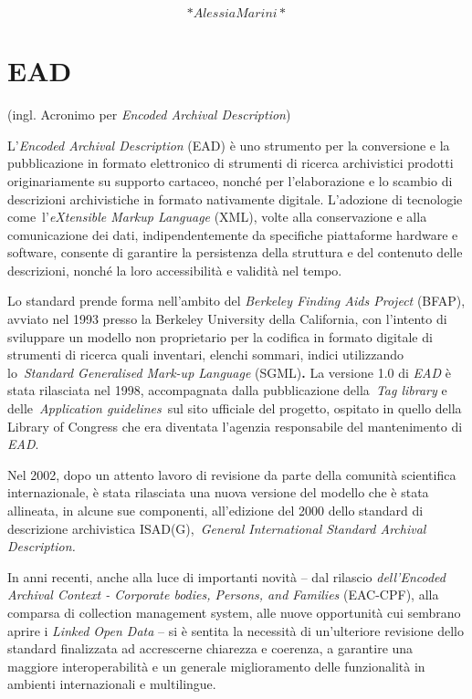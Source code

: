 \documentclass[
  b5paper,
  twoside,
  11pt,
  chapterprefix=false,
  bibliography=totocnumbered,
  listof=flat]{scrbook}
\begin{document}
\[*Alessia Marini*\]

\hypertarget{ead}{%
\chapter{EAD}\label{ead}}

(ingl. Acronimo per \emph{Encoded Archival Description})

L'\emph{Encoded Archival Description} (EAD) è uno strumento per la
conversione e la pubblicazione in formato elettronico di strumenti di
ricerca archivistici prodotti originariamente su supporto cartaceo,
nonché per l'elaborazione e lo scambio di descrizioni archivistiche in
formato nativamente digitale. L'adozione di tecnologie
come~l'\emph{eXtensible Markup Language} (XML), volte alla conservazione e
alla comunicazione dei dati, indipendentemente da specifiche piattaforme
hardware e software, consente di garantire la persistenza della
struttura e del contenuto delle descrizioni, nonché la loro
accessibilità e validità nel tempo.

Lo standard prende forma nell'ambito del \emph{Berkeley Finding Aids
Project} (BFAP), avviato nel 1993 presso la Berkeley University della
California, con l'intento di sviluppare un modello non proprietario per
la codifica in formato digitale di strumenti di ricerca quali inventari,
elenchi sommari, indici utilizzando lo~\emph{Standard Generalised Mark-up
Language} (SGML)\textbf{.} La versione 1.0 di \emph{EAD} è stata rilasciata nel
1998, accompagnata dalla pubblicazione della~\emph{Tag library} e
delle~\emph{Application guidelines}~sul sito ufficiale del progetto, ospitato
in quello della Library of Congress che era diventata l'agenzia
responsabile del mantenimento di \emph{EAD}.

Nel 2002, dopo un attento lavoro di revisione da parte della comunità
scientifica internazionale, è stata rilasciata una nuova versione del
modello che è stata allineata, in alcune sue componenti, all'edizione
del 2000 dello standard di descrizione archivistica ISAD(G),~\emph{General
International Standard Archival Description.}

In anni recenti, anche alla luce di importanti novità -- dal rilascio
\emph{dell'Encoded Archival Context - Corporate bodies, Persons, and
Families} (EAC-CPF), alla comparsa di collection management system, alle
nuove opportunità cui sembrano aprire i \emph{Linked Open Data} -- si è
sentita la necessità di un'ulteriore revisione dello standard
finalizzata ad accrescerne chiarezza e coerenza, a garantire una
maggiore interoperabilità e un generale miglioramento delle funzionalità
in ambienti internazionali e multilingue.
\end{document}
